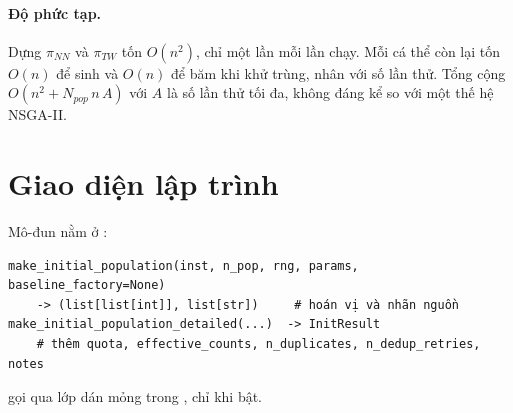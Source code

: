 \paragraph{Độ phức tạp.} Dựng $\pi_{NN}$ và $\pi_{TW}$ tốn $O(n^2)$, chỉ một lần mỗi lần chạy. Mỗi cá
thể còn lại tốn $O(n)$ để sinh và $O(n)$ để băm khi khử trùng, nhân với số lần thử. Tổng cộng
$O(n^2 + N_{pop}\, n\, A)$ với $A$ là số lần thử tối đa, không đáng kể so với một thế hệ NSGA-II.

\section{Giao diện lập trình}

Mô-đun nằm ở :
\begin{Verbatim}
make_initial_population(inst, n_pop, rng, params, baseline_factory=None)
    -> (list[list[int]], list[str])     # hoán vị và nhãn nguồn
make_initial_population_detailed(...)  -> InitResult
    # thêm quota, effective_counts, n_duplicates, n_dedup_retries, notes
\end{Verbatim}
 gọi qua lớp dán mỏng  trong
, chỉ khi  bật.
